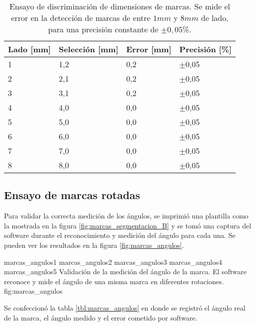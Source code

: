       \begin{table}[!ht]
         \centering
         \caption[Ensayos de discriminación de dimensiones de marcas]{Ensayo de discriminación de dimensiones de marcas. Se mide el error en la detección de marcas de entre $1mm$ y $8mm$ de lado, para una precisión constante de $\pm0,05$\%.}
         \begin{tabular}[!ht]{m{1.6cm}m{1.6cm}m{1.6cm}m{1.6cm}}
            \toprule
            \textbf{Lado [mm]} & \textbf{Selección [mm]} & \textbf{Error [mm]}& \textbf{Precisión [\%]}\\
            \midrule
            {1}& {1,2}& {0,2}& {$\pm$0,05}\\
            {2}& {2,1}& {0,2}& {$\pm$0,05}\\
            {3}& {3,1}& {0,2}& {$\pm$0,05}\\
            {4}& {4,0}& {0,0}& {$\pm$0,05}\\
            {5}& {5,0}& {0,0}& {$\pm$0,05}\\
            {6}& {6,0}& {0,0}& {$\pm$0,05}\\
            {7}& {7,0}& {0,0}& {$\pm$0,05}\\
            {8}& {8,0}& {0,0}& {$\pm$0,05}\\
            \bottomrule
         \end{tabular}
         \label{tbl:marcas_dimensiones}
      \end{table}

\subsection{Ensayo de marcas rotadas}

Para validar la correcta medición de los ángulos, se imprimió una plantilla como la mostrada en la figura \ref{fig:marcas_segmentacion_B} y se tomó una captura del software durante el reconocimiento y medición del ángulo para cada una. Se pueden ver los resultados en la figura \ref{fig:marcas_angulos}.

\subfigthreetwo
   {marcas_angulos1}
   {marcas_angulos2}
   {marcas_angulos3}
   {marcas_angulos4}
   {marcas_angulos5}
   {Validación de la medición del ángulo de la marca. El software reconoce y mide el ángulo de una misma marca en diferentes rotaciones.}
   {fig:marcas_angulos}

   Se confeccionó la tabla \ref{tbl:marcas_angulos} en donde se registró el ángulo real de la marca, el ángulo medido y el error cometido por software.\par

